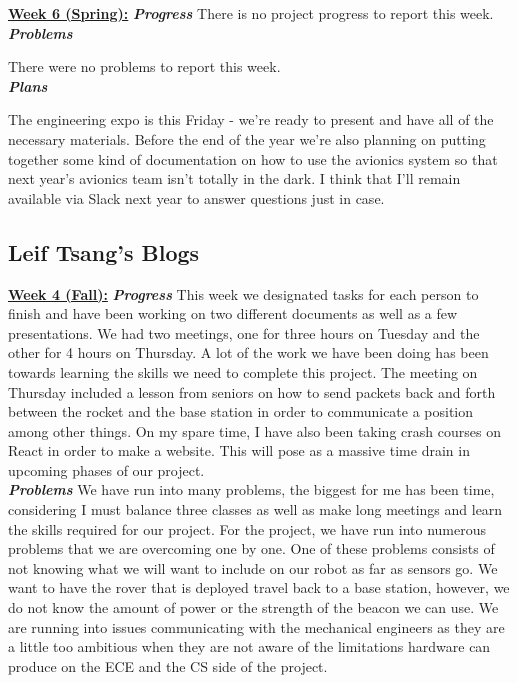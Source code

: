 \documentclass[onecolumn, draftclsnofoot, 10pt, compsoc]{IEEEtran}
\begin{document}
\underline{\textbf{Week 6 (Spring):}}
\newline\textbf{\textit{{Progress}}}
\newline There is no project progress to report this week. \\

\textbf{\textit{{Problems}}}

There were no problems to report this week. \\

\textbf{\textit{{Plans}}}

The engineering expo is this Friday - we're ready to present and have all of the necessary materials. Before the end of the year we're also planning on putting together some kind of documentation on how to use the avionics system so that next year's avionics team isn't totally in the dark. I think that I'll remain available via Slack next year to answer questions just in case. \\

\subsection{Leif Tsang's Blogs}

\underline{\textbf{Week 4 (Fall):}}
\newline\textbf{\textit{{Progress}}}
\newline 
This week we designated tasks for each person to finish and have been working on two different documents as well as a few presentations. We had two meetings, one for three hours on Tuesday and the other for 4 hours on Thursday. A lot of the work we have been doing has been towards learning the skills we need to complete this project. The meeting on Thursday included a lesson from seniors on how to send packets back and forth between the rocket and the base station in order to communicate a position among other things. On my spare time, I have also been taking crash courses on React in order to make a website. This will pose as a massive time drain in upcoming phases of our project.\\
\newline 
\textbf{\textit{{Problems}}}
\newline 
We have run into many problems, the biggest for me has been time, considering I must balance three classes as well as make long meetings and learn the skills required for our project. For the project, we have run into numerous problems that we are overcoming one by one. One of these problems consists of not knowing what we will want to include on our robot as far as sensors go. We want to have the rover that is deployed travel back to a base station, however, we do not know the amount of power or the strength of the beacon we can use. We are running into issues communicating with the mechanical engineers as they are a little too ambitious when they are not aware of the limitations hardware can produce on the ECE and the CS side of the project.\\
\end{document}
